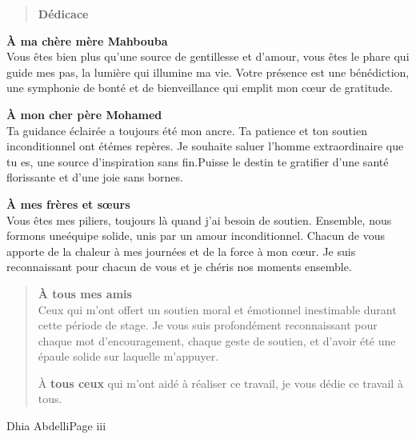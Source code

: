 \documentclass[
]{article}
\begin{document}
\begin{quote}
\textbf{Dédicace}
\end{quote}

\textbf{À ma chère mère Mahbouba}\\
Vous êtes bien plus qu'une source de gentillesse et d'amour, vous êtes
le phare qui guide mes pas, la lumière qui illumine ma vie. Votre
présence est une bénédiction, une symphonie de bonté et de bienveillance
qui emplit mon cœur de gratitude.

\textbf{À mon cher père Mohamed}\\
Ta guidance éclairée a toujours été mon ancre. Ta patience et ton
soutien inconditionnel ont étémes repères. Je souhaite saluer l'homme
extraordinaire que tu es, une source d'inspiration sans fin.Puisse le
destin te gratifier d'une santé florissante et d'une joie sans bornes.

\textbf{À mes frères et sœurs}\\
Vous êtes mes piliers, toujours là quand j'ai besoin de soutien.
Ensemble, nous formons uneéquipe solide, unis par un amour
inconditionnel. Chacun de vous apporte de la chaleur à mes journées et
de la force à mon cœur. Je suis reconnaissant pour chacun de vous et je
chéris nos moments ensemble.

\begin{quote}
\textbf{À tous mes amis}\\
Ceux qui m'ont offert un soutien moral et émotionnel inestimable durant
cette période de stage. Je vous suis profondément reconnaissant pour
chaque mot d'encouragement, chaque geste de soutien, et d'avoir été une
épaule solide sur laquelle m'appuyer.

À \textbf{tous ceux} qui m'ont aidé à réaliser ce travail, je vous dédie
ce travail à tous.
\end{quote}

\noindent Dhia Abdelli\hfill Page iii
\end{document}
